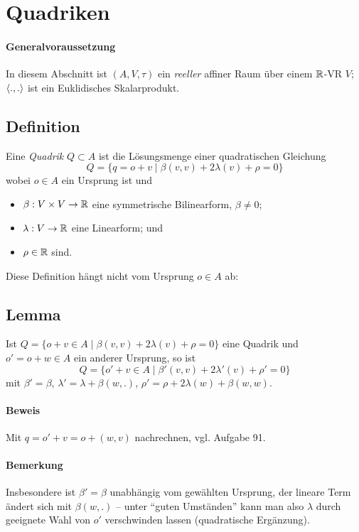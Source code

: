 \section{Quadriken}
\paragraph{Generalvoraussetzung}
	In diesem Abschnitt ist $ (A,V,\tau) $ ein \emph{reeller} affiner Raum über einem $ \mathbb{R} $-VR $ V $; $ \langle .,. \rangle $ ist ein Euklidisches Skalarprodukt.
\subsection{Definition}
\begin{Definition}[Quadrik]
	Eine \emph{Quadrik} $ Q\subset A $ ist die Lösungsmenge einer quadratischen Gleichung
		\[ Q = \{q=o+v\mid \beta(v,v)+2\lambda(v)+\rho = 0 \} \]
	wobei $ o\in A $ ein Ursprung ist und
	\begin{itemize}
		\item $ \beta: V\times V\to \mathbb{R} $ eine symmetrische Bilinearform, $ \beta \neq 0 $;
		\item $ \lambda: V\to \mathbb{R} $ eine Linearform; und
		\item $ \rho \in \mathbb{R}$ sind.
	\end{itemize}
	Diese Definition hängt nicht vom Ursprung $ o\in A $ ab:
\end{Definition}
\subsection{Lemma}
\begin{Lemma}[]
	Ist $ Q=\{o+v\in A \mid \beta(v,v)+2\lambda(v)+\rho=0 \} $ eine Quadrik und $ o' = o+w\in A $ ein anderer Ursprung, so ist
		\[ Q=\{o'+v\in A\mid \beta'(v,v)+2\lambda'(v)+\rho'=0 \} \]
	mit $ \beta'=\beta $, $ \lambda'=\lambda+\beta(w,.) $, $ \rho' = \rho+2\lambda(w)+\beta(w,w) $.
\end{Lemma}
\paragraph{Beweis}
	Mit $ q=o'+v=o+(w,v) $ nachrechnen, vgl. Aufgabe 91.
\paragraph{Bemerkung}
	Insbesondere ist $ \beta' = \beta $ unabhängig vom gewählten Ursprung, der lineare Term ändert sich mit $ \beta(w,.) $ -- unter "`guten Umständen"' kann man also $ \lambda $ durch geeignete Wahl von $ o' $ verschwinden lassen (quadratische Ergänzung).
